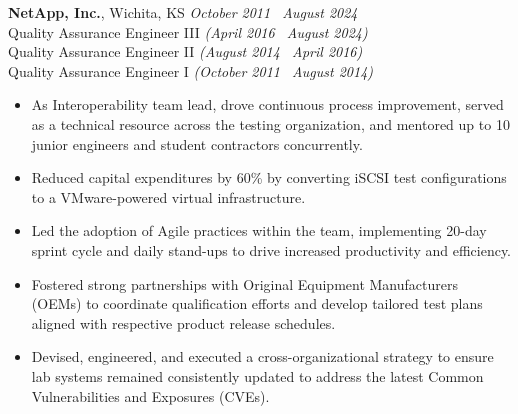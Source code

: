 \documentclass[10pt]{article}       %
\begin{document}
\textbf{NetApp, Inc.}, Wichita, KS \hfill \textit{October 2011 \textendash\ August 2024} \\
\vspace{1pt}
Quality Assurance Engineer III \textit{(April 2016 \textendash\ August 2024)} \\
Quality Assurance Engineer II \textit{(August 2014 \textendash\ April 2016)} \\
Quality Assurance Engineer I \textit{(October 2011 \textendash\ August 2014)} \\
\begin{itemize}
  \item As Interoperability team lead, drove continuous process improvement, served as a technical resource across the testing organization, and mentored up to 10 junior engineers and student contractors concurrently.
  \item Reduced capital expenditures by 60\% by converting iSCSI test configurations to a VMware-powered virtual infrastructure.
  \item Led the adoption of Agile practices within the team, implementing 20-day sprint cycle and daily stand-ups to drive increased productivity and efficiency.
  \item Fostered strong partnerships with Original Equipment Manufacturers (OEMs) to coordinate qualification efforts and develop tailored test plans aligned with respective product release schedules.
  \item Devised, engineered, and executed a cross-organizational strategy to ensure lab systems remained consistently updated to address the latest Common Vulnerabilities and Exposures (CVEs).

\end{itemize}
\end{document}
